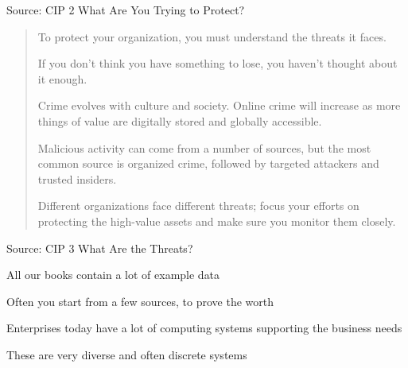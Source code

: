 \documentclass[Screen16to9,17pt]{foils}
\begin{document}
Source: CIP 2 What Are You Trying to Protect?







\begin{quote}
  \begin{list2}
\item To protect your organization, you must understand the threats it faces.
   \item If you don’t think you have something to lose, you haven’t thought about it
  enough.
   \item Crime evolves with culture and society. Online crime will increase as more things
  of value are digitally stored and globally accessible.
   \item Malicious activity can come from a number of sources, but the most common
  source is organized crime, followed by targeted attackers and trusted insiders.
   \item Different organizations face different threats; focus your efforts on protecting the
  high-value assets and make sure you monitor them closely.
\end{list2}

\end{quote}
Source: CIP 3 What Are the Threats?









\begin{quote}

\end{quote}

\begin{list2}
\item All our books contain a lot of example data
\item Often you start from a few sources, to prove the worth
\end{list2}





\begin{list2}
\item Enterprises today have a lot of computing systems supporting the business needs
\item These are very diverse and often discrete systems
\end{list2}
\end{document}
